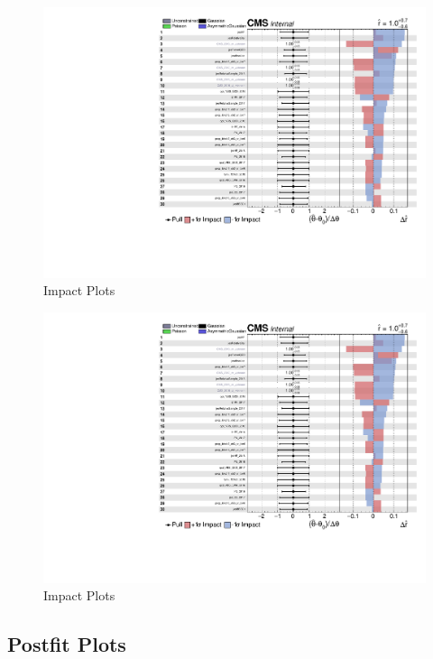 \begin{figure}[!ht]
  \centering
  \includegraphics[width=\textwidth,page=1]{analysis_plots/impact_plots/impacts_datacard_run2_z.pdf}
  \caption[Impact Plots]%
  {Impact Plots}%
  \label{fig:vbs-impact-plots-page1}
\end{figure}

\begin{figure}[!ht]
  \centering
  \includegraphics[width=\textwidth,page=2]{analysis_plots/impact_plots/impacts_datacard_run2_z.pdf}
  \caption[Impact Plots]%
  {Impact Plots}%
  \label{fig:vbs-impact-plots-page2}
\end{figure}


\clearpage
\subsection{
  Postfit Plots
}

